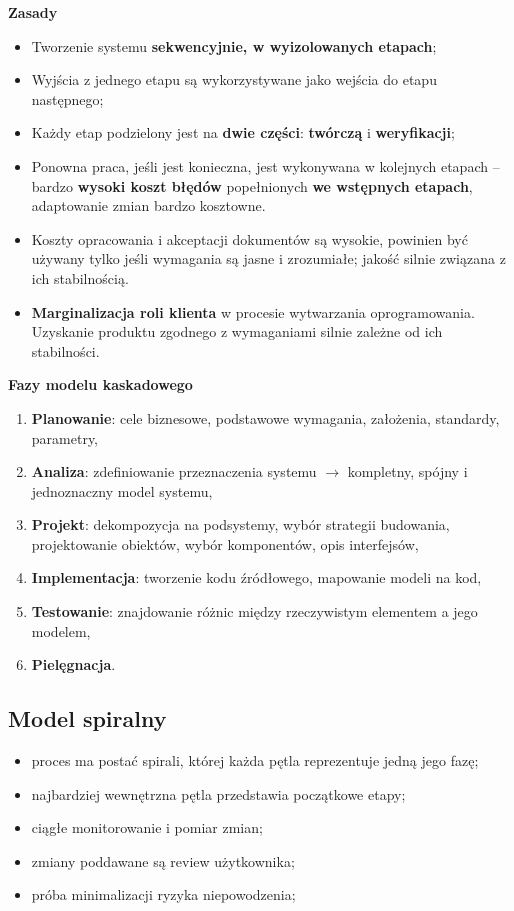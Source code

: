 \documentclass[main.tex]{subfiles}
\begin{document}
    \textbf{Zasady}
    \begin{itemize}[noitemsep]
        \item Tworzenie systemu \textbf{sekwencyjnie, w wyizolowanych etapach};
        \item Wyjścia z jednego etapu są wykorzystywane jako wejścia do etapu następnego;
        \item Każdy etap podzielony jest na \textbf{dwie części}: \textbf{twórczą} i \textbf{weryfikacji};
        \item Ponowna praca, jeśli jest konieczna, jest wykonywana w kolejnych etapach -- bardzo \textbf{wysoki koszt błędów}
        popełnionych \textbf{we wstępnych etapach}, adaptowanie zmian bardzo kosztowne.
        \item Koszty opracowania i akceptacji dokumentów są wysokie, powinien być używany
        tylko jeśli wymagania są jasne i zrozumiałe; jakość silnie związana z ich stabilnością.
        \item \textbf{Marginalizacja roli klienta} w procesie wytwarzania oprogramowania. Uzyskanie produktu zgodnego z wymaganiami
        silnie zależne od ich stabilności.
    \end{itemize}

    \noindent \textbf{Fazy modelu kaskadowego}
    \begin{enumerate}
        \item \textbf{Planowanie}: cele biznesowe, podstawowe wymagania, założenia, standardy, parametry,
        \item \textbf{Analiza}: zdefiniowanie przeznaczenia systemu $\rightarrow$ kompletny, spójny i jednoznaczny model systemu,
        \item \textbf{Projekt}: dekompozycja na podsystemy, wybór strategii budowania, projektowanie obiektów, wybór komponentów, opis interfejsów,
        \item \textbf{Implementacja}: tworzenie kodu źródłowego, mapowanie modeli na kod,
        \item \textbf{Testowanie}: znajdowanie różnic między rzeczywistym elementem a jego modelem,
        \item \textbf{Pielęgnacja}.
    \end{enumerate}

    \subsection{Model spiralny}
    \begin{itemize}
        \item proces ma postać spirali, której każda pętla reprezentuje jedną jego fazę;
        \item najbardziej wewnętrzna pętla przedstawia początkowe etapy;
        \item ciągłe monitorowanie i pomiar zmian;
        \item zmiany poddawane są review użytkownika;
        \item próba minimalizacji ryzyka niepowodzenia;
    \end{itemize}
\end{document}
